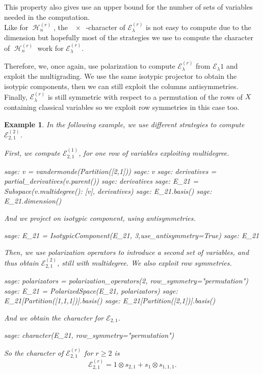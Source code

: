 \documentclass[letter,12pt]{article}
\newcommand{\Elambda}[1]{\mathcal{E}_{#1}}
\newcommand{\Elambdar}[2]{\mathcal{E}_{#1}^{(#2)}}
\DeclareMathOperator{\Sn}{\mathbb{S}_n}
\DeclareMathOperator{\GLr}{GL_r}
\DeclareMathOperator{\harmonics}{\mathcal{H}}
\newtheorem{example}{Example}
\begin{document}
	This property also gives use an upper bound for the number of sets of variables needed in the computation. \\
	
	Like for $\harmonics_n^{(r)}$, the $\GLr \times \Sn$-character of $\Elambdar{\lambda}{r}$ is not easy to compute due to the dimension but hopefully most of the strategies we use to compute the character of $\harmonics_{n}^{(r)}$ work for $\Elambdar{\lambda}{r}$. 
	
	Therefore, we, once again, use polarization to compute $\Elambdar{\lambda}{r}$ from $\Elambda{\lambda}{1}$ and exploit the multigrading. We use the same isotypic projector to obtain the isotypic components, then we can still exploit the columns antisymmetries. 
%		
%		
	Finally, $\Elambdar{\lambda}{r}$ is still symmetric with respect to a permutation of the rows of $X$ containing classical variables so we exploit row symmetries in this case too.\\
	
	\begin{example} In the following example, we use different strategies to compute $\Elambdar{2,1}{2}$. 
		
		First, we compute $\Elambdar{2,1}{1}$, for one row of variables exploiting multidegree. 
		\begin{sagecommandline}
			sage: v = vandermonde(Partition([2,1]))
			sage: v
			sage: derivatives = partial_derivatives(v.parent())
			sage: derivatives
			sage: E_21 = Subspace({v.multidegree(): [v]}, derivatives)
			sage: E_21.basis()
			sage: E_21.dimension()
		\end{sagecommandline}
		And we project on isotypic component, using antisymmetries. 
		\begin{sagecommandline}
			sage: E_21 = IsotypicComponent(E_21, 3,use_antisymmetry=True)
			sage: E_21
		\end{sagecommandline}
		Then, we use polarization operators to introduce a second set of variables, and thus obtain $\Elambdar{2,1}{2}$, still with multidegree. We also exploit row symmetries. 
		\begin{sagecommandline}
			sage: polarizators = polarization_operators(2, row_symmetry="permutation")
			sage: E_21 = PolarizedSpace(E_21, polarizators)
			sage: E_21[Partition([1,1,1])].basis()
			sage: E_21[Partition([2,1])].basis()
		\end{sagecommandline}
		And we obtain the character for $\Elambda{2,1}$. 
	 	\begin{sagecommandline}
		 	sage: character(E_21, row_symmetry="permutation")
		\end{sagecommandline}
	
	So the character of $\Elambdar{2,1}{r}$ for $r \geq 2$ is $$\Elambdar{2,1}{r} = 1 \otimes s_{2,1} + s_{1} \otimes s_{1,1,1} .$$
	\end{example} 
\end{document}
